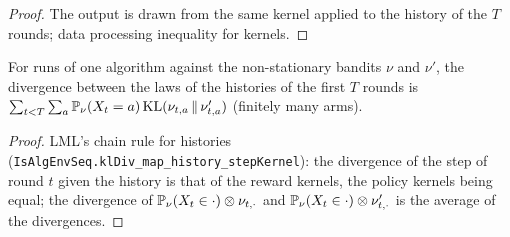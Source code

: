 \begin{proof}
  \leanok
  The output is drawn from the same kernel applied to the history of the $T$ rounds; data
  processing inequality for kernels.
\end{proof}

\begin{lemma}
  \label{lem:chain_rule_nonstationary}
  \leanok
  For runs of one algorithm against the non-stationary bandits $\nu$ and $\nu'$, the divergence
  between the laws of the histories of the first $T$ rounds is
  $\sum_{t < T} \sum_a \mathbb{P}_\nu(X_t = a)\, \mathrm{KL}(\nu_{t, a} \,\|\, \nu'_{t, a})$ (finitely many arms).
\end{lemma}

\begin{proof}
  \leanok
  LML's chain rule for histories (\texttt{IsAlgEnvSeq.klDiv\_map\_history\_stepKernel}): the
  divergence of the step of round $t$ given the history is that of the reward kernels, the policy
  kernels being equal; the divergence of $\mathbb{P}_\nu(X_t \in \cdot) \otimes \nu_{t, \cdot}$ and
  $\mathbb{P}_\nu(X_t \in \cdot) \otimes \nu'_{t, \cdot}$ is the average of the divergences.
\end{proof}
